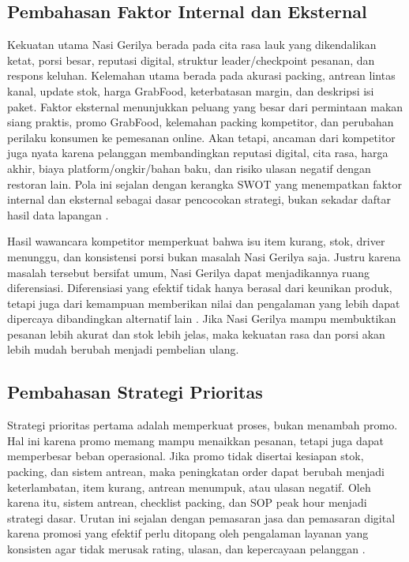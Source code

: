 \subsection{Pembahasan Faktor Internal dan Eksternal}
Kekuatan utama Nasi Gerilya berada pada cita rasa lauk yang dikendalikan ketat, porsi besar, reputasi digital, struktur leader/checkpoint pesanan, dan respons keluhan. Kelemahan utama berada pada akurasi packing, antrean lintas kanal, update stok, harga GrabFood, keterbatasan margin, dan deskripsi isi paket. Faktor eksternal menunjukkan peluang yang besar dari permintaan makan siang praktis, promo GrabFood, kelemahan packing kompetitor, dan perubahan perilaku konsumen ke pemesanan online. Akan tetapi, ancaman dari kompetitor juga nyata karena pelanggan membandingkan reputasi digital, cita rasa, harga akhir, biaya platform/ongkir/bahan baku, dan risiko ulasan negatif dengan restoran lain. Pola ini sejalan dengan kerangka SWOT yang menempatkan faktor internal dan eksternal sebagai dasar pencocokan strategi, bukan sekadar daftar hasil data lapangan \parencite{david2023strategicmanagement,gurel2017swot,rangkuti2016analisisSWOT}.

Hasil wawancara kompetitor memperkuat bahwa isu item kurang, stok, driver menunggu, dan konsistensi porsi bukan masalah Nasi Gerilya saja. Justru karena masalah tersebut bersifat umum, Nasi Gerilya dapat menjadikannya ruang diferensiasi. Diferensiasi yang efektif tidak hanya berasal dari keunikan produk, tetapi juga dari kemampuan memberikan nilai dan pengalaman yang lebih dapat dipercaya dibandingkan alternatif lain \parencite{kotler2023principlesmarketing,wirtz2024servicesmarketing}. Jika Nasi Gerilya mampu membuktikan pesanan lebih akurat dan stok lebih jelas, maka kekuatan rasa dan porsi akan lebih mudah berubah menjadi pembelian ulang.

\subsection{Pembahasan Strategi Prioritas}
Strategi prioritas pertama adalah memperkuat proses, bukan menambah promo. Hal ini karena promo memang mampu menaikkan pesanan, tetapi juga dapat memperbesar beban operasional. Jika promo tidak disertai kesiapan stok, packing, dan sistem antrean, maka peningkatan order dapat berubah menjadi keterlambatan, item kurang, antrean menumpuk, atau ulasan negatif. Oleh karena itu, sistem antrean, checklist packing, dan SOP peak hour menjadi strategi dasar. Urutan ini sejalan dengan pemasaran jasa dan pemasaran digital karena promosi yang efektif perlu ditopang oleh pengalaman layanan yang konsisten agar tidak merusak rating, ulasan, dan kepercayaan pelanggan \parencite{wirtz2024servicesmarketing,chaffey2022digitalmarketing}.

